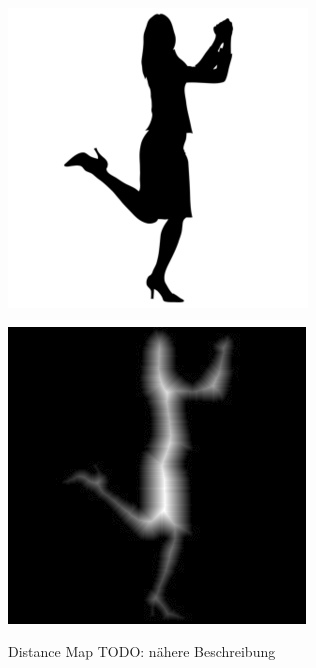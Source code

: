 \begin{figure}[h]
	\centering
	\begin{minipage}{4cm}
		\centering
		\includegraphics[width=1.0\linewidth]{./fig/person.jpg}
		\label{fig:beispiel_person}
	\end{minipage}
	\hspace{3cm}
	\begin{minipage}{4cm}
		\centering
		\includegraphics[width=1.0\linewidth]{./fig/distance_map_beispiel}
		\label{fig:distance_map_beispiel}
	\end{minipage}
	\caption{Distance Map TODO: nähere Beschreibung}
\end{figure}
